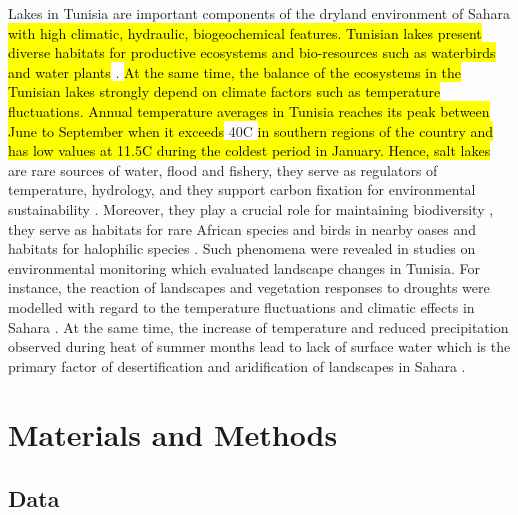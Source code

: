\documentclass[land,article,submit,pdftex,moreauthors]{Definitions/mdpi}
\begin{document}
Lakes in Tunisia are important components of the dryland environment of Sahara\hl{ with high climatic, hydraulic, biogeochemical features. Tunisian lakes present diverse habitats for productive ecosystems and bio-resources such as waterbirds and water plants} \cite{SAHBANI2022102288}. \hl{At the same time, the balance of the ecosystems in the Tunisian lakes strongly depend on climate factors such as  temperature fluctuations. Annual temperature averages in Tunisia reaches its peak between June to September when it exceeds} 40\degree C\hl{ in southern regions of the country and has low values at 11.5}\degree \hl{C during the coldest period in January. Hence, salt lakes} are rare sources of water, flood and fishery, they serve as regulators of temperature, hydrology, and they support carbon fixation for environmental sustainability \cite{NIGAM2020201}. Moreover, they play a crucial role for maintaining biodiversity \cite{Neji}, they serve as habitats for rare African species and birds in nearby oases \cite{Baduel,RADDADI2022104806,Kamel} and habitats for halophilic species \cite{NEIFAR20191802}. Such phenomena were revealed in studies on environmental monitoring which evaluated landscape changes in Tunisia. For instance, the reaction of landscapes and vegetation responses to droughts were modelled with regard to the temperature fluctuations and climatic effects in Sahara \cite{HANAFI2008557,PAUSATA2020235,Lemenkova202313}. At the same time, the increase of temperature and reduced precipitation observed during heat of summer months lead to lack of surface water which is the primary factor of desertification and aridification of landscapes in Sahara \cite{OSWALD2023369,DODORICO2013326}. 

\section{Materials and Methods}

\subsection{Data}
\end{document}
